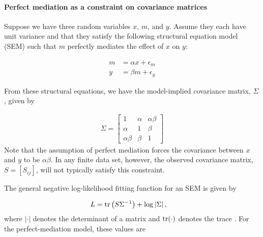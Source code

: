 \documentclass[
]{article}
\begin{document}
\paragraph{Perfect mediation as a constraint on covariance
matrices}\label{perfect-mediation-as-a-constraint-on-covariance-matrices}

Suppose we have three random variables \(x\), \(m\), and \(y\). Assume
they each have unit variance and that they satisfy the following
structural equation model (SEM) such that \(m\) perfectly mediates the
effect of \(x\) on \(y\):

\begin{align}
m &= \alpha x + \epsilon_m \label{eqn:perfect_mediation1}\\ 
y &= \beta m + \epsilon_y  \label{eqn:perfect_mediation2}
\end{align}

From these structural equations, we have the model-implied covariance
matrix, \(\Sigma\), given by

\begin{align}
\label{eqn:model_implied_covariance}
\Sigma = 
  \begin{bmatrix}
1 & \alpha & \alpha \beta \\
\alpha & 1 & \beta \\
\alpha \beta & \beta & 1
\end{bmatrix}
\end{align} Note that the assumption of perfect mediation forces the
covariance between \(x\) and \(y\) to be \(\alpha \beta\). In any finite
data set, however, the observed covariance matrix, \(S = [S_{ij}]\),
will not typically satisfy this constraint.

The general negative log-likelihood fitting function for an SEM is given
by

\begin{align}
\label{eq:loglikelihood}
L &= {\rm tr}\left(S \Sigma^{-1}\right) + \log\left|\Sigma\right|,
\end{align} where \(|\cdot|\) denotes the determinant of a matrix and
\({\rm tr}(\cdot)\) denotes the trace \cite{bollen2014structural}. For
the perfect-mediation model, these values are
\end{document}
